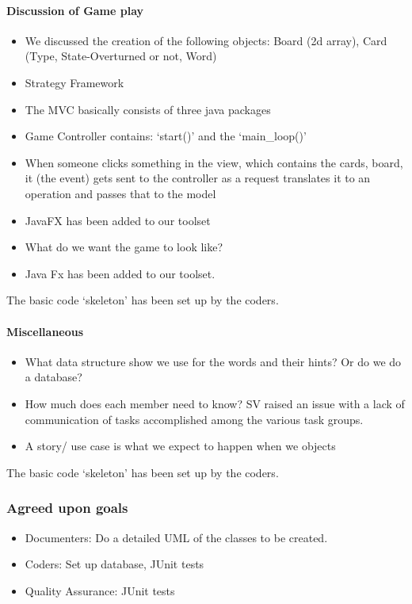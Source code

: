 \documentclass[10pt, a4paper]{article}
\begin{document}
			\paragraph{Discussion of Game play }
			\begin{itemize}
				\item We discussed the creation of the following objects: Board (2d array), Card (Type, State-Overturned or not, Word)
				\item Strategy Framework
				\item The MVC basically consists of three java packages
				\item Game Controller contains: ‘start()’ and the ‘main\_loop()’ 
				\item When someone clicks something in the view, which contains the cards, board, it (the event) gets sent to the controller as a request translates it to an operation and passes that to the model 
				\item JavaFX has been added to our toolset
				\item What do we want the game to look like? 
				\item Java Fx has been added to our toolset. 
				
			\end{itemize}
			The basic code ‘skeleton’ has been set up by the coders. 
			
			\paragraph{Miscellaneous }
			\begin{itemize}
				\item What data structure show we use for the words and their hints? Or do we do a database? 
				\item How much does each member need to know? SV raised an issue with a lack of communication of tasks accomplished among the various task groups.  
				\item A story/ use case is what we expect to happen when we objects 
				
			\end{itemize}
			The basic code ‘skeleton’ has been set up by the coders. 
			
			\subsubsection{Agreed upon goals}
			\begin{itemize}
				\item Documenters: Do a detailed UML of the classes to be created. 
				\item Coders: Set up database, JUnit tests 
				\item Quality Assurance: JUnit tests
			\end{itemize}
			\pagebreak
			
\end{document}
